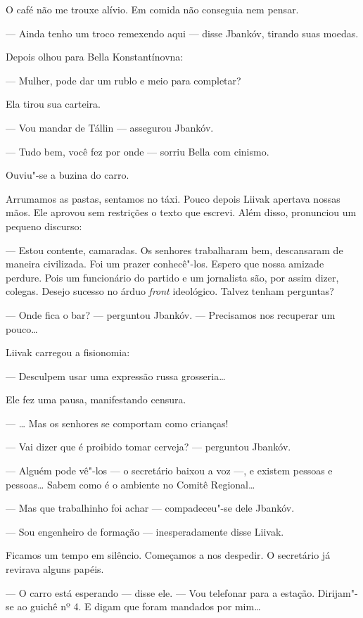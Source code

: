 O café não me trouxe alívio. Em comida não conseguia nem pensar.

--- Ainda tenho um troco remexendo aqui --- disse Jbankóv,
tirando suas moedas.

Depois olhou para Bella Konstantínovna:

--- Mulher, pode dar um rublo e meio para completar?

Ela tirou sua carteira.

--- Vou mandar de Tállin --- assegurou Jbankóv.

--- Tudo bem, você fez por onde --- sorriu Bella com
cinismo.

Ouviu"-se a buzina do carro.

Arrumamos as pastas, sentamos no táxi. Pouco depois Liivak apertava
nossas mãos. Ele aprovou sem restrições o texto que escrevi. Além disso,
pronunciou um pequeno discurso:

--- Estou contente, camaradas. Os senhores trabalharam bem,
descansaram de maneira civilizada. Foi um prazer conhecê"-los. Espero que
nossa amizade perdure. Pois um funcionário do partido e um jornalista
são, por assim dizer, colegas. Desejo sucesso no árduo \emph{front}
ideológico. Talvez tenham perguntas?

--- Onde fica o bar? --- perguntou Jbankóv. ---
Precisamos nos recuperar um pouco\ldots{}

Liivak carregou a fisionomia:

--- Desculpem usar uma expressão russa grosseria\ldots{}

Ele fez uma pausa, manifestando censura.

--- \ldots{} Mas os senhores se comportam como crianças!

--- Vai dizer que é proibido tomar cerveja? --- perguntou
Jbankóv.

--- Alguém pode vê"-los --- o secretário baixou a voz
---, e existem pessoas e pessoas\ldots{} Sabem como é o ambiente no
Comitê Regional\ldots{}

--- Mas que trabalhinho foi achar --- compadeceu"-se dele
Jbankóv.

--- Sou engenheiro de formação --- inesperadamente disse
Liivak.

Ficamos um tempo em silêncio. Começamos a nos despedir. O secretário já
revirava alguns papéis.

--- O carro está esperando --- disse ele. --- Vou
telefonar para a estação. Dirijam"-se ao guichê nº 4. E digam que foram
mandados por mim\ldots{}


